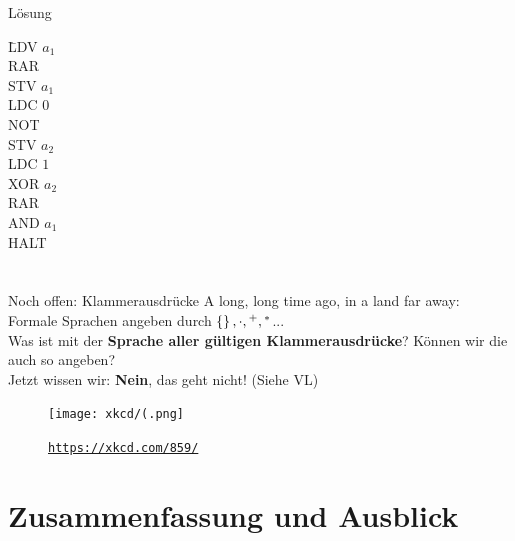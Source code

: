 \begin{frame}{Lösung}
    \begin{tabbing}
        \;\= LDV $a_1$ \\
        \> RAR \\
        \> STV $a_1$ \\
        \> LDC $0$ \\
        \> NOT \\
        \> STV $a_2$ \\
        \> LDC $1$ \\
        \> XOR $a_2$ \\
        \> RAR \\
        \> AND $a_1$ \\
        \> HALT
	\end{tabbing}
\end{frame}

\section{}
\begin{frame}{Noch offen: Klammerausdrücke}
	A long, long time ago, in a land far away:\\
	\medskip
	Formale Sprachen angeben durch $\left\{\right\}, \cdot, {}^+, {}^*$...\\
	Was ist mit der \textbf{Sprache aller gültigen Klammerausdrücke}? Können wir die auch so angeben?\\[1em]
	\pause
	\impl Jetzt wissen wir: \textbf{Nein}, das geht nicht! (Siehe VL)\\[1em]
	
	\begin{figure}[H]
		\centering
		\texttt{[image: xkcd/(.png]}
		\vspace{-7pt}
		\caption{ \texttt{\url{https://xkcd.com/859/}} }
	\end{figure}
\end{frame}



%

\appendix
\beginbackup

\section{Zusammenfassung und Ausblick}

